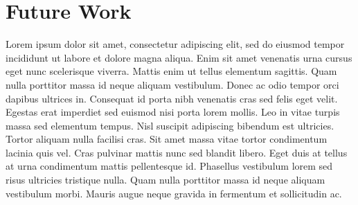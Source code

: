\section{Future Work}
Lorem ipsum dolor sit amet, consectetur adipiscing elit, sed do eiusmod tempor incididunt ut labore et dolore magna aliqua.
Enim sit amet venenatis urna cursus eget nunc scelerisque viverra.
Mattis enim ut tellus elementum sagittis.
Quam nulla porttitor massa id neque aliquam vestibulum.
Donec ac odio tempor orci dapibus ultrices in.
Consequat id porta nibh venenatis cras sed felis eget velit.
Egestas erat imperdiet sed euismod nisi porta lorem mollis.
Leo in vitae turpis massa sed elementum tempus.
Nisl suscipit adipiscing bibendum est ultricies.
Tortor aliquam nulla facilisi cras. Sit amet massa vitae tortor condimentum lacinia quis vel.
Cras pulvinar mattis nunc sed blandit libero.
Eget duis at tellus at urna condimentum mattis pellentesque id.
Phasellus vestibulum lorem sed risus ultricies tristique nulla.
Quam nulla porttitor massa id neque aliquam vestibulum morbi.
Mauris augue neque gravida in fermentum et sollicitudin ac.
